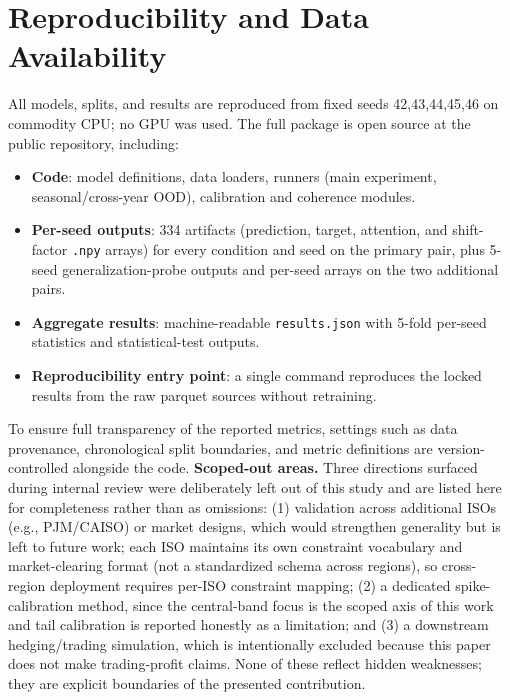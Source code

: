 {\section{Reproducibility and Data Availability}
All models, splits, and results are reproduced from fixed seeds {42,43,44,45,46} on commodity CPU; no GPU was used. The full package is open source at the public repository, including:
\begin{itemize}
  \item \textbf{Code}: model definitions, data loaders, runners (main experiment, seasonal/cross-year OOD), calibration and coherence modules.
  \item \textbf{Per-seed outputs}: 334 artifacts (prediction, target, attention, and shift-factor \texttt{.npy} arrays) for every condition and seed on the primary pair, plus 5-seed generalization-probe outputs and per-seed arrays on the two additional pairs.
  \item \textbf{Aggregate results}: machine-readable \texttt{results.json} with 5-fold per-seed statistics and statistical-test outputs.
  \item \textbf{Reproducibility entry point}: a single command reproduces the locked results from the raw parquet sources without retraining.
\end{itemize}
To ensure full transparency of the reported metrics, settings such as data provenance, chronological split boundaries, and metric definitions are version-controlled alongside the code.
\textbf{Scoped-out areas.} Three directions surfaced during internal review were deliberately left out of this study and are listed here for completeness rather than as omissions: (1) validation across additional ISOs (e.g., PJM/CAISO) or market designs, which would strengthen generality but is left to future work; each ISO maintains its own constraint vocabulary and market-clearing format (not a standardized schema across regions), so cross-region deployment requires per-ISO constraint mapping; (2) a dedicated spike-calibration method, since the central-band focus is the scoped axis of this work and tail calibration is reported honestly as a limitation; and (3) a downstream hedging/trading simulation, which is intentionally excluded because this paper does not make trading-profit claims. None of these reflect hidden weaknesses; they are explicit boundaries of the presented contribution.
}

